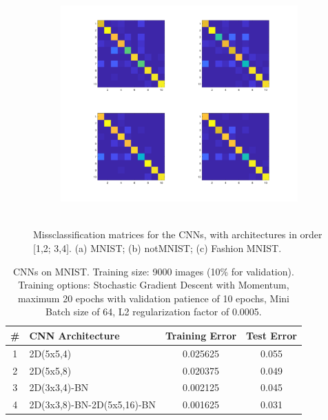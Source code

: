 \documentclass[letterpaper,12pt]{article}
\begin{document}
\begin{figure}[p]
\begin{subfigure}{.3\textwidth}
  \centering
  \includegraphics[width=\linewidth]{CNN_Fashion_MNIST}
  \caption{~}
\end{subfigure}
\caption{Missclassification matrices for the CNNs, with architectures in order [1,2; 3,4]. (a) MNIST; (b) notMNIST; (c) Fashion MNIST.}
\label{fig:jj}
\end{figure}

\begin{table}[p]
\centering
  \begin{tabular}{|c|l|c|c|}
  	\hline
    \# & CNN Architecture & Training Error & Test Error\\
    \hline
    \hline
        1 & 2D(5x5,4)  &                 0.025625   &  0.055\\     
    2 & 2D(5x5,8)  &               0.020375  &   0.049  \\   
    3 & 2D(3x3,4)-BN      &          0.002125  &   0.045   \\  
    4 & 2D(3x3,8)-BN-2D(5x5,16)-BN      &        0.001625  &   0.031 \\
    \hline
  \end{tabular}
  \vspace{0.5em}
  \caption{CNNs on MNIST. {Training size: 9000 images (10\% for validation). Training options: Stochastic Gradient Descent with Momentum, maximum 20 epochs with validation patience of 10 epochs, Mini Batch size of 64, L2 regularization factor of 0.0005.}}
\end{table}
\end{document}
